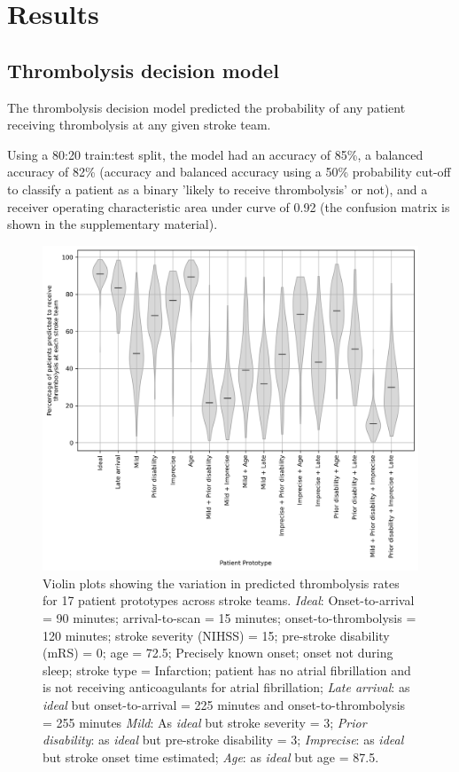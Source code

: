 \section{Results}


\subsection{Thrombolysis decision model}

The thrombolysis decision model predicted the probability of any patient receiving thrombolysis at any given stroke team.

Using a 80:20 train:test split, the model had an accuracy of 85\%, a balanced accuracy of 82\% (accuracy and balanced accuracy using a 50\% probability cut-off to classify a patient as a binary 'likely to receive thrombolysis' or not), and a receiver operating characteristic area under curve of 0.92 (the confusion matrix is shown in the supplementary material).



\begin{figure}
    \centering
    \includegraphics[width=0.75\linewidth]{images/prototype_patients_all_teams}
    \caption{Violin plots showing the variation in predicted thrombolysis rates for 17 patient prototypes across stroke teams. \textit{Ideal}: Onset-to-arrival = 90 minutes; arrival-to-scan = 15 minutes; onset-to-thrombolysis = 120 minutes; stroke severity (NIHSS) = 15; pre-stroke disability (mRS) = 0; age = 72.5; Precisely known onset; onset not during sleep; stroke type = Infarction; patient has no atrial fibrillation and is not receiving anticoagulants for atrial fibrillation; \textit{Late arrival}: as \textit{ideal} but onset-to-arrival = 225 minutes and onset-to-thrombolysis = 255 minutes \textit{Mild}: As \textit{ideal} but stroke severity = 3; \textit{Prior disability}: as \textit{ideal} but pre-stroke disability = 3; \textit{Imprecise}: as \textit{ideal} but stroke onset time estimated; \textit{Age}: as \textit{ideal} but age = 87.5.}
    \label{fig:thrombolysis_rates_prototype_patients}
\end{figure}

